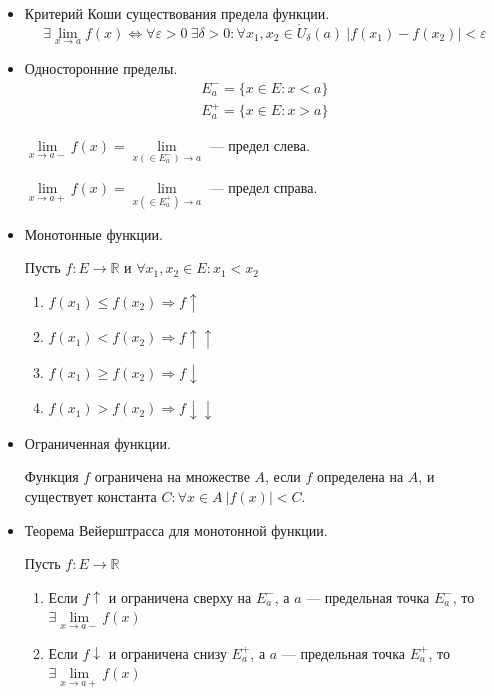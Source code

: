 \documentclass[14pt]{extarticle}
\numberwithin{equation}{section}
\newcommand{\RR}{\mathbb{R}}
\begin{document}
    \begin{itemize}
        \item
            Критерий Коши существования предела функции.
            \[
                \exists \lim\limits_{x \to a} f(x)
                \Leftrightarrow
                \forall \varepsilon > 0 \ \exists \delta > 0 :
                    \forall x_1, x_2 \in \mathring{U}_\delta(a) \ |f(x_1) - f(x_2)| < \varepsilon
            \]
        \item
            Односторонние пределы.
            \begin{gather*}
                E_a^- = \{ x \in E : x < a \}
                \\
                E_a^+ = \{ x \in E : x > a \}
            \end{gather*}

            \( \lim\limits_{x \to a-} f(x) = \lim\limits_{x ( \in E_a^- ) \to a} \) --- предел слева.

            \( \lim\limits_{x \to a+} f(x) = \lim\limits_{x ( \in E_a^+ ) \to a} \) --- предел справа.
        \item
            Монотонные функции.

            Пусть \( f : E \to \RR \) и \( \forall x_1, x_2 \in E : x_1 < x_2 \)
            \begin{enumerate}
                \item
                    \( f(x_1) \leq f(x_2) \Rightarrow f \uparrow \)
                \item
                    \( f(x_1) < f(x_2) \Rightarrow f \uparrow \uparrow \)
                \item
                    \( f(x_1) \geq f(x_2) \Rightarrow f \downarrow \)
                \item
                    \( f(x_1) > f(x_2) \Rightarrow f \downarrow \downarrow \)
            \end{enumerate}
        \item
            Ограниченная функции.

            Функция \( f \) ограничена на множестве \( A \),
            если \( f \) определена на \( A \),
            и существует константа \( C : \forall x \in A \ |f(x)| < C \).
        \item
            Теорема Вейерштрасса для монотонной функции.

            Пусть \( f : E \to \RR \)
            \begin{enumerate}
                \item
                    Если \( f \uparrow \) и ограничена сверху на \( E_a^- \),
                    а \( a \) --- предельная точка \( E_a^- \),
                    то \( \exists \lim\limits_{x \to a-} f(x) \)
                \item
                    Если \( f \downarrow \) и ограничена снизу \( E_a^+ \),
                    а \( a \) --- предельная точка \( E_a^+ \),
                    то \( \exists \lim\limits_{x \to a+} f(x) \)
            \end{enumerate}
    \end{itemize}
\end{document}
